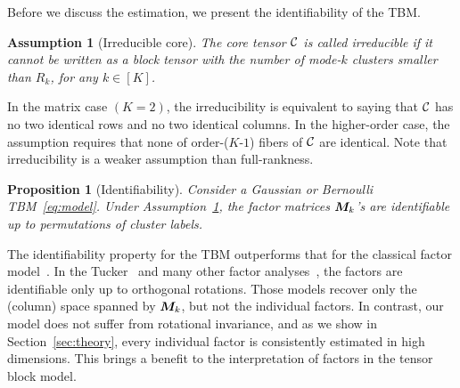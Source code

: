 \documentclass{article}
\newtheorem{prop}{Proposition}
\newtheorem{ass}{Assumption}
\begin{document}
Before we discuss the estimation, we present the identifiability of the TBM. 
\vspace{-.1cm}
\begin{ass}[Irreducible core]\label{ass:core}
The core tensor $\mathcal{C}$ is called irreducible if it cannot be written as a block tensor with the number of mode-$k$ clusters smaller than $R_k$, for any $k\in[K]$. 
\end{ass}
\vspace{-.1cm}
In the matrix case $(K=2)$, the irreducibility is equivalent to saying that $\mathcal{C}$ has no two identical rows and no two identical columns. In the higher-order case, the assumption requires that none of order-($K$-$1$) fibers of $\mathcal{C}$ are identical. Note that irreducibility is a weaker assumption than full-rankness. 
\vspace{-.4cm}
\begin{prop}[Identifiability]\label{prop:factors}
Consider a Gaussian or Bernoulli TBM~\eqref{eq:model}. Under Assumption~\ref{ass:core}, the factor matrices $\boldsymbol{M}_k$'s are identifiable up to permutations of cluster labels. 
\end{prop}
\vspace{-.1cm}
The identifiability property for the TBM outperforms that for the classical factor model~\cite{darton1980rotation,abdi2003factor}. In the Tucker~\cite{zhang2018tensor,kolda2009tensor} and many other factor analyses~\cite{darton1980rotation,abdi2003factor}, the factors are identifiable only up to orthogonal rotations. Those models recover only the (column) space spanned by $\boldsymbol{M}_k$, but not the individual factors. In contrast, our model does not suffer from rotational invariance, and as we show in Section~\ref{sec:theory}, every individual factor is consistently estimated in high dimensions. This brings a benefit to the interpretation of factors in the tensor block model.  
\end{document}
